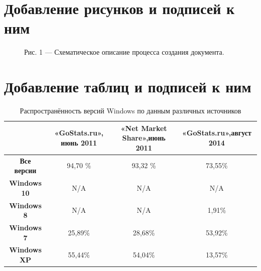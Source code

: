 \documentclass{report} %
\begin{document}
\section{Добавление рисунков и подписей к ним}
\begin{figure}[!h]
    \caption{Рис. 1 — Схематическое описание процесса создания документа.} %
	\label {fig_1} %
\end{figure}


\section{Добавление таблиц и подписей к ним}

\begin{table}[!h] %
	\centering %
	\caption{Распространённость версий Windows по данным различных источников} \label{tab_1} %
    \begin{tabular}{ |*{4}c| } %
		 \hline
            & \textbf{«GoStats.ru», июнь 2011} & \textbf{«Net Market Share»,июнь 2011} & \textbf{«GoStats.ru»,август 2014} \\ 
		 \hline
         \textbf{Все версии} & 94,70 \% & 93,32 \% & 73,55\% \\
 		 \hline
         \textbf{Windows 10} & N/A & N/A & N/A \\ 
		 \hline
         \textbf{Windows 8} & N/A & N/A & 1,91\% \\ 
		 \hline
         \textbf{Windows 7} & 25,89\% & 28,68\% & 53,92\% \\
		 \hline
         \textbf{Windows XP} & 55,44\% & 54,04\% & 13,57\% \\
		 \hline

  

	\end{tabular}
\end{table}
\end{document}
